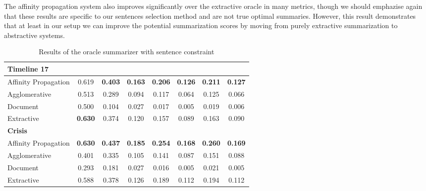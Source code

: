 \documentclass[a4paper,BCOR=10mm]{report}
\numberwithin{lemma}{chapter}
\numberwithin{definition}{chapter}
\begin{document}
The affinity propagation system also improves significantly over the extractive oracle in many metrics, though we should emphazise again that these results are specific to our sentences selection method and are not true optimal summaries. However, this result demonstrates that at least in our setup we can improve the potential summarization scores by moving from purely extractive summarization to abstractive systems.

\begin{table}
\begin{tabular}{|l|ccccccc|}
\hline
\multicolumn{ 8 }{|l|}{ \textbf{ Timeline 17 } }\\\hline
Affinity Propagation & 0.619&\textbf{ 0.403 }&\textbf{ 0.163 }&\textbf{ 0.206 }&\textbf{ 0.126 }&\textbf{ 0.211 }&\textbf{ 0.127 }\\\hline
Agglomerative & 0.513&0.289&0.094&0.117&0.064&0.125&0.066\\\hline
Document & 0.500&0.104&0.027&0.017&0.005&0.019&0.006\\\hline
Extractive & \textbf{ 0.630 }&0.374&0.120&0.157&0.089&0.163&0.090\\\hline
\hline\multicolumn{ 8 }{|l|}{ \textbf{ Crisis } }\\\hline
Affinity Propagation & \textbf{ 0.630 }&\textbf{ 0.437 }&\textbf{ 0.185 }&\textbf{ 0.254 }&\textbf{ 0.168 }&\textbf{ 0.260 }&\textbf{ 0.169 }\\\hline
Agglomerative & 0.401&0.335&0.105&0.141&0.087&0.151&0.088\\\hline
Document & 0.293&0.181&0.027&0.016&0.005&0.021&0.005\\\hline
Extractive & 0.588&0.378&0.126&0.189&0.112&0.194&0.112\\\hline
\end{tabular}
\caption{Results of the oracle summarizer with sentence constraint}
\label{tab:results-oracle-sent}
\end{table}
\end{document}

